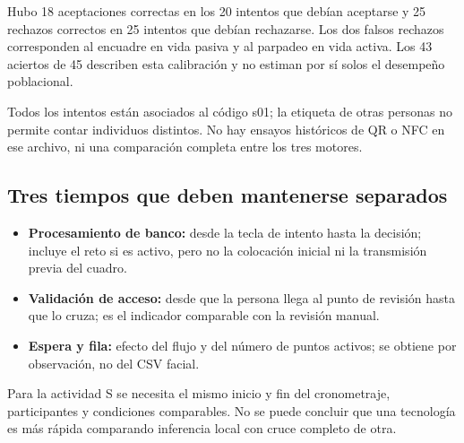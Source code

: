 \documentclass[11pt,letterpaper]{article}
\begin{document}
Hubo 18 aceptaciones correctas en los 20 intentos que debían aceptarse y 25 rechazos correctos en 25 intentos que debían rechazarse. Los dos falsos rechazos corresponden al encuadre en vida pasiva y al parpadeo en vida activa. Los 43 aciertos de 45 describen esta calibración y no estiman por sí solos el desempeño poblacional.

Todos los intentos están asociados al código s01; la etiqueta de otras personas no permite contar individuos distintos. No hay ensayos históricos de QR o NFC en ese archivo, ni una comparación completa entre los tres motores.

\subsection{Tres tiempos que deben mantenerse separados}
\begin{itemize}
\item \textbf{Procesamiento de banco:} desde la tecla de intento hasta la decisión; incluye el reto si es activo, pero no la colocación inicial ni la transmisión previa del cuadro.
\item \textbf{Validación de acceso:} desde que la persona llega al punto de revisión hasta que lo cruza; es el indicador comparable con la revisión manual.
\item \textbf{Espera y fila:} efecto del flujo y del número de puntos activos; se obtiene por observación, no del CSV facial.
\end{itemize}
Para la actividad S se necesita el mismo inicio y fin del cronometraje, participantes y condiciones comparables. No se puede concluir que una tecnología es más rápida comparando inferencia local con cruce completo de otra.


\end{document}
